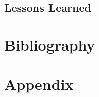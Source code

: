 \documentclass[12pt]{diazessay}
\begin{document}
\subsection{Lessons Learned}

\clearpage

\section{Bibliography}




\clearpage

\section{Appendix}
\end{document}

